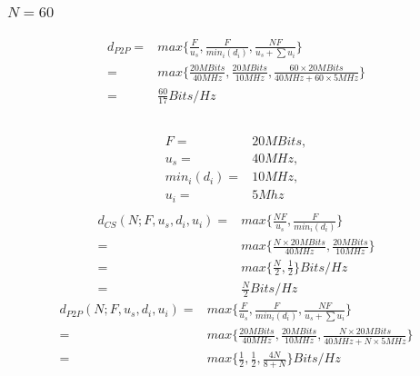 \documentclass{article}
\begin{document}
            \subsubsection*{$N=60$}
                \begin{equation*}
                    \begin{split}
                        d_{P2P}=&max\{\frac{F}{u_s},\frac{F}{{min}_i(d_i)},\frac{NF}{u_s+\sum u_i}\}\\
                            =&max\{\frac{20MBits}{40MHz},\frac{20MBits}{10MHz},\frac{60\times 20MBits }{40MHz+60\times 5MHz}\}\\
                            =&\frac{60}{17}Bits/Hz
                    \end{split}
                \end{equation*}
        \subsection{}
            \begin{equation*}
                \begin{split}
                    F=&20MBits,\\
                    u_s=&40MHz,\\
                    min_i(d_i)=&10MHz,\\
                    u_i=&5Mhz\\
                \end{split}
            \end{equation*}
            \begin{equation*}
                \begin{split}
                    d_{CS}(N;F,u_s,d_i,u_i)=&max\{\frac{NF}{u_s},\frac{F}{{min}_i(d_i)}\}\\
                        =&max\{\frac{N\times 20MBits}{40MHz},\frac{20MBits}{10MHz}\}\\
                        =&max\{\frac{N}{2},\frac{1}{2}\}Bits/Hz\\
                        =&\frac{N}{2}Bits/Hz
                \end{split}
            \end{equation*}
            \begin{equation*}
                \begin{split}
                    d_{P2P}(N;F,u_s,d_i,u_i)=&max\{\frac{F}{u_s},\frac{F}{{min}_i(d_i)},\frac{NF}{u_s+\sum u_i}\}\\
                        =&max\{\frac{20MBits}{40MHz},\frac{20MBits}{10MHz},\frac{N\times20MBits}{40MHz+N\times 5MHz}\}\\
                        =&max\{\frac{1}{2},\frac{1}{2},\frac{4N}{8+N}\}Bits/Hz\\
                \end{split}
            \end{equation*}
\end{document}
